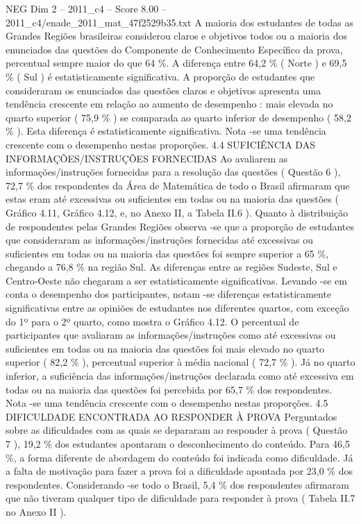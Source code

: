 \begin{textsample}{NEG Dim 2 – 2011\_c4 – Score 8.00 – 2011\_c4/enade\_2011\_mat\_47f2529b35.txt}
A maioria dos estudantes de todas as Grandes Regiões brasileiras considerou claros e objetivos todos ou a maioria dos enunciados das questões do Componente de Conhecimento Específico da prova, percentual sempre maior do que 64 \%.
A diferença entre 64,2 \% ( Norte ) e 69,5 \% ( Sul ) é estatisticamente significativa.
A proporção de estudantes que consideraram os enunciados das questões claros e objetivos apresenta uma tendência crescente em relação ao aumento de desempenho : mais elevada no quarto superior ( 75,9 \% ) se comparada ao quarto inferior de desempenho ( 58,2 \% ).
Esta diferença é estatisticamente significativa.
Nota -se uma tendência crescente com o desempenho nestas proporções. 4.4 SUFICIÊNCIA DAS INFORMAÇÕES/INSTRUÇÕES FORNECIDAS Ao avaliarem as informações/instruções fornecidas para a resolução das questões ( Questão 6 ), 72,7 \% dos respondentes da Área de Matemática de todo o Brasil afirmaram que estas eram até excessivas ou suficientes em todas ou na maioria das questões ( Gráfico 4.11, Gráfico 4.12, e, no Anexo II, a Tabela II.6 ).
Quanto à distribuição de respondentes pelas Grandes Regiões observa -se que a proporção de estudantes que consideraram as informações/instruções fornecidas até excessivas ou suficientes em todas ou na maioria das questões foi sempre superior a 65 \%, chegando a 76,8 \% na região Sul.
As diferenças entre as regiões Sudeste, Sul e Centro-Oeste não chegaram a ser estatisticamente significativas.
Levando -se em conta o desempenho dos participantes, notam -se diferenças estatisticamente significativas entre as opiniões de estudantes nos diferentes quartos, com exceção do 1º para o 2º quarto, como mostra o Gráfico 4.12.
O percentual de participantes que avaliaram as informações/instruções como até excessivas ou suficientes em todas ou na maioria das questões foi mais elevado no quarto superior ( 82,2 \% ), percentual superior à média nacional ( 72,7 \% ).
Já no quarto inferior, a suficiência das informações/instruções declarada como até excessiva em todas ou na maioria das questões foi percebida por 65,7 \% dos respondentes.
Nota -se uma tendência crescente com o desempenho nestas proporções. 4.5 DIFICULDADE ENCONTRADA AO RESPONDER À PROVA Perguntados sobre as dificuldades com as quais se depararam ao responder à prova ( Questão 7 ), 19,2 \% dos estudantes apontaram o desconhecimento do conteúdo.
Para 46,5 \%, a forma diferente de abordagem do conteúdo foi indicada como dificuldade.
Já a falta de motivação para fazer a prova foi a dificuldade apontada por 23,0 \% dos respondentes.
Considerando -se todo o Brasil, 5,4 \% dos respondentes afirmaram que não tiveram qualquer tipo de dificuldade para responder à prova ( Tabela II.7 no Anexo II ).

\end{textsample}
